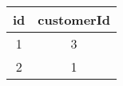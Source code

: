 \begin{tabular}{|c|c|}
    \hline
        \textbf{id} & \textbf{customerId} \\ \hline
        1 & 3 \\ 
        2 & 1 \\ \hline
\end{tabular}
